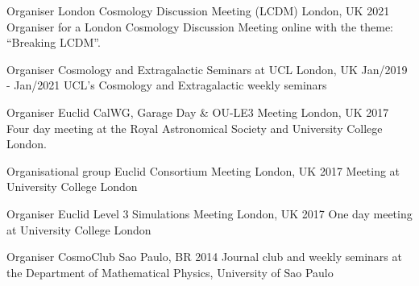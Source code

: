 

\begin{cventries}
  \cventry
    {Organiser} %
    {London Cosmology Discussion Meeting (LCDM)} %
    {London, UK} %
    {2021} %
    {
{Organiser for a London Cosmology Discussion Meeting online with the theme: ``Breaking LCDM''.}
    }
    
  \cventry
    {Organiser} %
    {Cosmology and Extragalactic Seminars at UCL} %
    {London, UK} %
    {Jan/2019 - Jan/2021} %
    {
{UCL's Cosmology and Extragalactic weekly seminars}
    }
    
 \cventry
    {Organiser} %
    {Euclid CalWG, Garage Day \& OU-LE3 Meeting} %
    {London, UK} %
    {2017} %
    {
{Four day meeting at the Royal Astronomical Society and
University College London.}
    }

  \cventry
    {Organisational group} %
    {Euclid Consortium Meeting} %
    {London, UK} %
    {2017} %
    {
        {Meeting at University College London}
    }
    
  \cventry
    {Organiser} %
    {Euclid Level 3 Simulations Meeting} %
    {London, UK} %
    {2017} %
    {
 {One day meeting at University College London}
    }

  \cventry
    {Organiser} %
    {CosmoClub} %
    {Sao Paulo, BR} %
    {2014} %
    {
        {Journal club and weekly seminars at the Department of Mathematical
Physics, University of Sao Paulo}
    }



\end{cventries}

